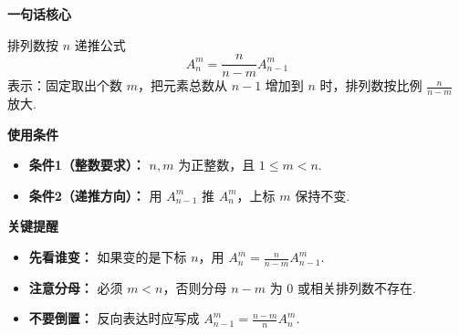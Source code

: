 \begin{summarybox}
\textbf{\textcolor{CSummary}{一句话核心}}\par
排列数按 $n$ 递推公式
\[
  A_n^m=\frac{n}{n-m}A_{n-1}^m
\]
表示：固定取出个数 $m$，把元素总数从 $n-1$ 增加到 $n$ 时，排列数按比例 $\frac{n}{n-m}$ 放大.

\medskip
\textbf{\textcolor{CSummary}{使用条件}}
\begin{itemize}[leftmargin=*, itemsep=0.5em, topsep=0.4em]
  \item \textbf{条件1（整数要求）：} $n,m$ 为正整数，且 $1\le m<n$.
  \item \textbf{条件2（递推方向）：} 用 $A_{n-1}^m$ 推 $A_n^m$，上标 $m$ 保持不变.
\end{itemize}

\medskip
\textbf{\textcolor{CSummary}{关键提醒}}
\begin{itemize}[leftmargin=*, itemsep=0.5em, topsep=0.4em]
  \item \textbf{先看谁变：} 如果变的是下标 $n$，用 $A_n^m=\frac{n}{n-m}A_{n-1}^m$.
  \item \textbf{注意分母：} 必须 $m<n$，否则分母 $n-m$ 为 $0$ 或相关排列数不存在.
  \item \textbf{不要倒置：} 反向表达时应写成 $A_{n-1}^m=\frac{n-m}{n}A_n^m$.
\end{itemize}
\end{summarybox}

